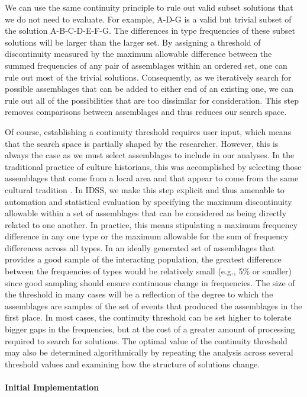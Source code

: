 \documentclass[10pt,letterpaper]{article}
\begin{document}
We can use the same continuity principle to rule out valid subset solutions that we do not need to evaluate. For example, A-D-G is a valid but trivial subset of the solution A-B-C-D-E-F-G. The differences in type frequencies of these subset solutions will be larger than the larger set. By assigning a threshold of discontinuity measured by the maximum allowable difference between the summed frequencies of any pair of assemblages within an ordered set, one can rule out most of the trivial solutions. Consequently, as we iteratively search for possible assemblages that can be added to either end of an existing one, we can rule out all of the possibilities that are too dissimilar for consideration. This step removes comparisons between assemblages and thus reduces our search space. 

Of course, establishing a continuity threshold requires user input, which means that the search space is partially shaped by the researcher. However, this is always the case as we must select assemblages to include in our analyses. In the traditional practice of culture historians, this was accomplished by selecting those assemblages that come from a local area and that appear to come from the same cultural tradition \cite{Dunnell:1970aa}. In IDSS, we make this step explicit and thus amenable to automation and statistical evaluation by specifying the maximum discontinuity allowable within a set of assemblages that can be considered as being directly related to one another. In practice, this means stipulating a maximum frequency difference in any one type or the maximum allowable for the sum of frequency differences across all types. In an ideally generated set of assemblages that provides a good sample of the interacting population, the greatest difference between the frequencies of types would be relatively small (e.g., 5\% or smaller) since good sampling should ensure continuous change in frequencies. The size of the threshold in many cases will be a reflection of the degree to which the assemblages are samples of the set of events that produced the assemblages in the first place. In most cases, the continuity threshold can be set higher to tolerate bigger gaps in the frequencies, but at the cost of a greater amount of processing required to search for solutions. The optimal value of the continuity threshold may also be determined algorithmically by repeating the analysis across several threshold values and examining how the structure of solutions change.

\paragraph{Initial Implementation}
\end{document}
